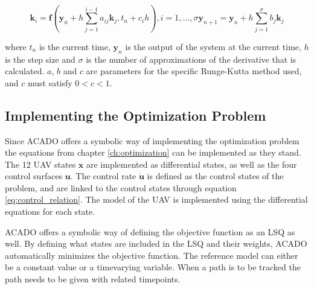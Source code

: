 \begin{subequations}
\begin{equation}
	\mathbf{k}_i = \mathbf{f}(\mathbf{y}_n + h \sum_{j=1}^{i-1} a_{ij}\mathbf{k}_j, t_n + c_ih), i = 1, ..., \sigma
\end{equation}
\begin{equation}
	\mathbf{y}_{n+1} = \mathbf{y}_n + h \sum_{j=1}^\sigma b_j \mathbf{k}_j
\end{equation}
\end{subequations}

where $t_n$ is the current time, $\mathbf{y}_n$ is the output of the system at the current time, $h$ is the step size and $\sigma$ is the number of approximations of the derivative that is calculated. $a$, $b$ and $c$ are parameters for the specific Runge-Kutta method used, and $c$ must satisfy $0 < c < 1$.






\subsection{Implementing the Optimization Problem}

Since ACADO offers a symbolic way of implementing the optimization problem the equations from chapter \ref{ch:optimization} can be implemented as they stand. The 12 UAV states $\mathbf{x}$ are implemented as differential states, as well as the four control surfaces $\mathbf{u}$. The control rate $\mathbf{\dot{u}}$ is defined as the control states of the problem, and are linked to the control states through equation \ref{eq:control_relation}. The model of the UAV is implemented using the differential equations for each state.

ACADO offers a symbolic way of defining the objective function as an LSQ as well. By defining what states are included in the LSQ and their weights, ACADO automatically minimizes the objective function. The reference model can either be a constant value or a timevarying variable. When a path is to be tracked the path needs to be given with related timepoints.


